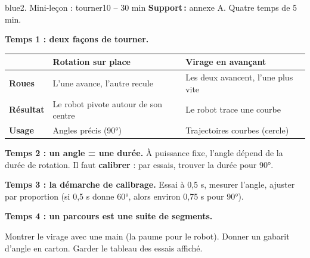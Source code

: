 \documentclass[11pt,a4paper]{article}
\begin{document}
\begin{etape}{blue}{2. Mini-leçon : tourner}{10 -- 30 min}
\textbf{Support\,:} annexe A. Quatre temps de 5 min.

\textbf{Temps 1 : deux façons de tourner.}
\begin{center}
\begin{tabularx}{\linewidth}{>{\bfseries}p{3.4cm}Y Y}
\toprule
 & Rotation sur place & Virage en avançant\\
\midrule
Roues & L'une avance, l'autre recule & Les deux avancent, l'une plus vite\\
Résultat & Le robot pivote autour de son centre & Le robot trace une courbe\\
Usage & Angles précis (90°) & Trajectoires courbes (cercle)\\
\bottomrule
\end{tabularx}
\end{center}

\textbf{Temps 2 : un angle = une durée.} À puissance fixe, l'angle dépend de la durée de rotation. Il faut \textbf{calibrer} : par essais, trouver la durée pour 90°.

\textbf{Temps 3 : la démarche de calibrage.} Essai à 0,5 s, mesurer l'angle, ajuster par proportion (si 0,5 s donne 60°, alors environ 0,75 s pour 90°).

\textbf{Temps 4 : un parcours est une suite de segments.}
\begin{center}
\end{center}

\begin{astuce}
Montrer le virage avec une main (la paume pour le robot). Donner un gabarit d'angle en carton. Garder le tableau des essais affiché.
\end{astuce}
\end{etape}
\end{document}
